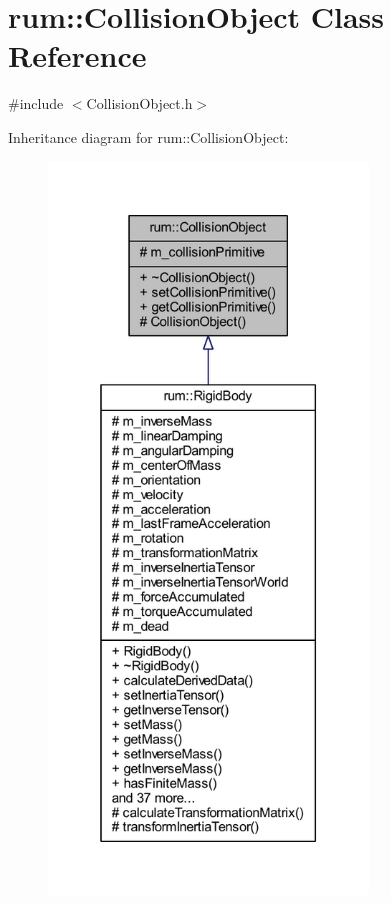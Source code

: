 \hypertarget{classrum_1_1_collision_object}{}\section{rum\+:\+:Collision\+Object Class Reference}
\label{classrum_1_1_collision_object}


{\ttfamily \#include $<$Collision\+Object.\+h$>$}



Inheritance diagram for rum\+:\+:Collision\+Object\+:\nopagebreak
\begin{figure}[H]
\begin{center}
\leavevmode
\includegraphics[height=550pt]{classrum_1_1_collision_object__inherit__graph}
\end{center}
\end{figure}


